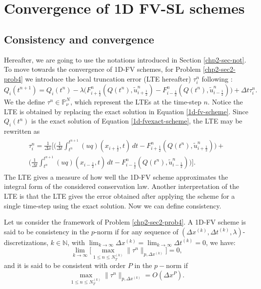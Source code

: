 \section{Convergence of 1D FV-SL schemes}
\label{convergence-1dfvsl}
\subsection{Consistency and convergence}
\label{chp2-sub-CC}
Hereafter, we are going to use the notations introduced in Section \ref{chp2-sec-not}.
To move towards the convergence of 1D-FV schemes, for  Problem \ref{chp2-sec2-prob4} we introduce the local truncation error (LTE hereafter)
$\tau_i^n$ following \citet{leveque:2002}:
\begin{equation}
	\label{consistency-1d-eq1}
	Q_i(t^{n+1}) = Q_i(t^n) - \lambda
	\bigg({F}^n_{i+\frac{1}{2}}(Q(t^n),\tilde{u}^n_{i+\frac{1}{2}})-
	{F}^n_{i-\frac{1}{2}}(Q(t^n),\tilde{u}^n_{i-\frac{1}{2}}) \bigg) + \Delta t \tau_i^n.
\end{equation}
We the define $\tau^n \in \mathbb{P}^{N}_{\nu}$, which represent the LTEs at the time-step $n$.
Notice the LTE is obtained by replacing the exact solution in Equation \eqref{1d-fv-scheme}.
Since $Q_i(t^n)$ is the exact solution of Equation \eqref{1d-fvexact-scheme}, 
the LTE may be rewritten as
\begin{align}
	\begin{split}
		\label{consistency-1d-eq2}
		\tau_{i}^n = 
		\frac{1}{\Delta x} \bigg[  \bigg( \frac{1}{\Delta t}\int_{t^{n}}^{t^{n+1}}
		{(uq)}(x_{i+\frac{1}{2}}, t) \,dt - {F}^n_{i+\frac{1}{2}}(Q(t^n),\tilde{u}^n_{i+\frac{1}{2}}) \bigg) +\\
		\bigg( \frac{1}{\Delta t}\int_{t^{n}}^{t^{n+1}}
		{(uq)}(x_{i-\frac{1}{2}}, t) \,dt - {F}^n_{i-\frac{1}{2}}(Q(t^n),\tilde{u}^n_{i-\frac{1}{2}}) \bigg)
		\bigg].
	\end{split}
\end{align}
The LTE gives a measure of how well the 1D-FV scheme approximates the integral form
of the considered conservation law. 
Another interpretation of the LTE is that the LTE gives the error obtained after applying
the scheme for a single time-step using the exact solution.
Now we can define consistency.
\begin{definition}[Consistency]
	\label{chp2-def-cons}
	Let us consider the framework of Problem \ref{chp2-sec2-prob4}.
	A 1D-FV scheme is said to be consistency in the $p$-norm if for any sequence of $(\Delta x^{(k)}, \Delta t^{(k)},\lambda)$-discretizations, 
	$k \in \mathbb{N}$, with $\lim_{k\to \infty }{\Delta x^{(k)}} = \lim_{k\to \infty }{\Delta t^{(k)}} = 0$, we have:
	\begin{equation*}
		\lim_{k \to \infty}\bigg[ {\max_{1\leq n\leq N_T^{(k)}}}{\|\tau^n\|_{p,\Delta x^{(k)}}} \bigg] = 0,
	\end{equation*}
	and it is said to be consistent with order $P$ in the $p-$norm if %
	\begin{equation*}
		{\max_{1\leq n\leq N_T^{(k)}}}{\|\tau^n\|_{p,\Delta x^{(k)}}} = O(\Delta x^P).
	\end{equation*}
\end{definition}
